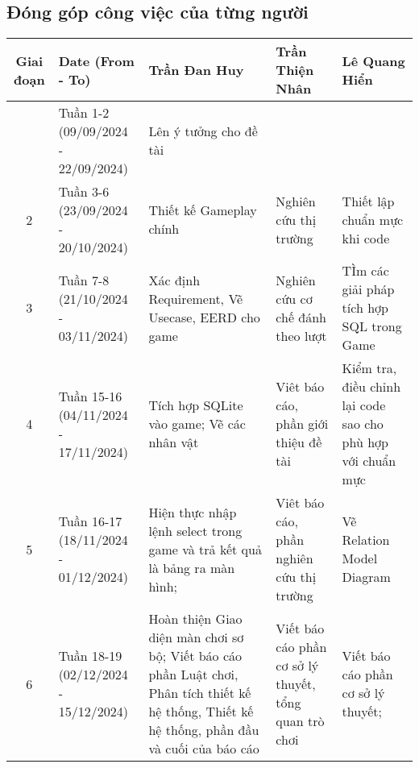 \subsection{Đóng góp công việc của từng người}
\begin{longtable}{|c|p{2cm}|p{3cm}|p{3cm}|p{3cm}|}	
	\hline
	\textbf{Giai đoạn} & \textbf{Date (From - To)} & \textbf{Trần Đan Huy} & \textbf{Trần Thiện Nhân} & \textbf{Lê Quang Hiển}\\
	\hline
	\endhead
	
	\hline
	\endfoot
	
	\hline
	1 & Tuần 1-2 (09/09/2024 - 22/09/2024) & Lên ý tưởng cho đề tài & &\\
	2 &  Tuần 3-6 (23/09/2024 - 20/10/2024) & Thiết kế Gameplay chính & Nghiên cứu thị trường & Thiết lập chuẩn mực khi code \\
	3 &  Tuần 7-8 (21/10/2024 - 03/11/2024) & Xác định Requirement, Vẽ Usecase, EERD cho game & Nghiên cứu cơ chế đánh theo lượt & TÌm các giải pháp tích hợp SQL trong Game\\
	4 & Tuần 15-16 (04/11/2024 - 17/11/2024) & Tích hợp SQLite vào game;  Vẽ các nhân vật & Viêt báo cáo, phần giới thiệu đề tài & Kiểm tra, điều chỉnh lại code sao cho phù hợp với chuẩn mực \\
	5 & Tuần 16-17 (18/11/2024 - 01/12/2024) & Hiện thực nhập lệnh select trong game và trả kết quả là bảng ra màn hình; & Viêt báo cáo, phần nghiên cứu thị trường & Vẽ Relation Model Diagram \\
	6 & Tuần 18-19 (02/12/2024 - 15/12/2024) & Hoàn thiện Giao diện màn chơi sơ bộ; Viết báo cáo phần Luật chơi, Phân tích thiết kế hệ thống, Thiết kế hệ thống, phần đầu và cuối của báo cáo  & Viết báo cáo phần cơ sở lý thuyết, tổng quan trò chơi & Viết báo cáo phần cơ sở lý thuyết; \\
	\hline
	
\end{longtable}
